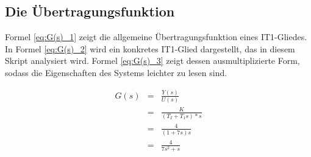 \subsection{Die Übertragungsfunktion}

Formel \ref{eq:G(s)_1} zeigt die allgemeine Übertragungsfunktion eines IT1-Gliedes.\\ In Formel \ref{eq:G(s)_2} wird ein konkretes IT1-Glied dargestellt, das in diesem Skript analysiert wird. Formel \ref{eq:G(s)_3} zeigt dessen ausmultiplizierte Form, sodass die Eigenschaften des Systems leichter zu lesen sind.

\begin{eqnarray}
G(s) &=& \frac{Y(s)}{U(s)} \\
\label{eq:G(s)_1}
&=& \frac{K}{(T_I+T_1s)*s} \\
\label{eq:G(s)_2}
&=& \frac{4}{(1+7s)s} \\
\label{eq:G(s)_3}
&=& \frac{4}{7s^2+s}
\end{eqnarray}